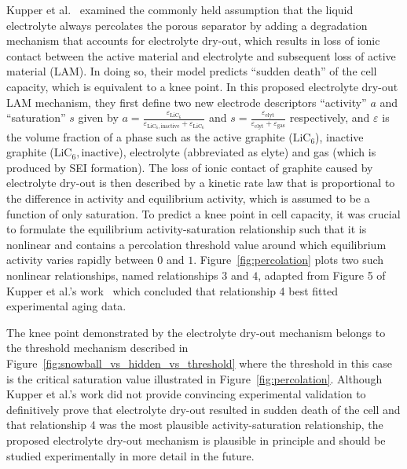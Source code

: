 \documentclass{article}
\begin{document}
Kupper et al.~\cite{kupper_end--life_2018} examined the commonly held assumption that the liquid electrolyte always percolates the porous separator by adding a degradation mechanism that accounts for electrolyte dry-out, which results in loss of ionic contact between the active material and electrolyte and subsequent loss of active material (LAM). In doing so, their model predicts ``sudden death'' of the cell capacity, which is equivalent to a knee point. In this proposed electrolyte dry-out LAM mechanism, they first define two new electrode descriptors ``activity'' $a$ and ``saturation'' $s$ given by $a = \frac{\varepsilon_{\text{LiC}_6}}{\varepsilon_{\text{LiC}_6,\text{inactive}}+\varepsilon_{\text{LiC}_6}}$ and $s = \frac{\varepsilon_\text{elyt}}{\varepsilon_\text{elyt}+\varepsilon_\text{gas}}$ respectively, and $\varepsilon$ is the volume fraction of a phase such as the active graphite ($\text{LiC}_6$), inactive graphite ($\text{LiC}_6,\text{inactive}$), electrolyte (abbreviated as elyte) and gas (which is produced by SEI formation). The loss of ionic contact of graphite caused by electrolyte dry-out is then described by a kinetic rate law that is proportional to the difference in activity and equilibrium activity, which is assumed to be a function of only saturation. To predict a knee point in cell capacity, it was crucial to formulate the equilibrium activity-saturation relationship such that it is nonlinear and contains a percolation threshold value around which equilibrium activity varies rapidly between $0$ and $1$. Figure~\ref{fig:percolation} plots two such nonlinear relationships, named relationships $3$ and $4$, adapted from Figure 5 of Kupper et al.'s work~\cite{kupper_end--life_2018} which concluded that relationship 4 best fitted experimental aging data.

The knee point demonstrated by the electrolyte dry-out mechanism belongs to the threshold mechanism described in Figure~\ref{fig:snowball_vs_hidden_vs_threshold} where the threshold in this case is the critical saturation value illustrated in Figure~\ref{fig:percolation}. Although Kupper et al.'s work did not provide convincing experimental validation to definitively prove that electrolyte dry-out resulted in sudden death of the cell and that relationship 4 was the most plausible activity-saturation relationship, the proposed electrolyte dry-out mechanism is plausible in principle and should be studied experimentally in more detail in the future.
\end{document}
